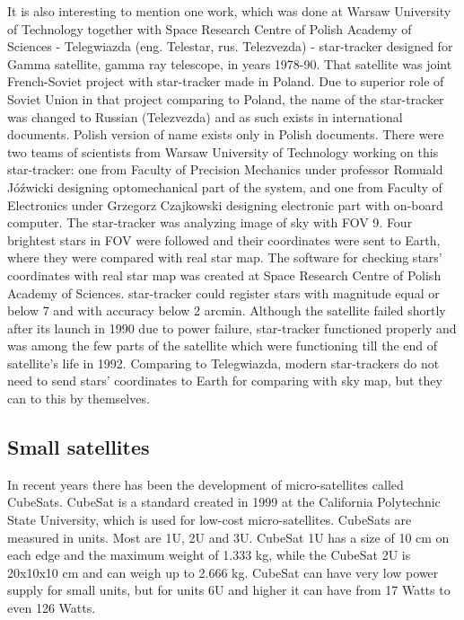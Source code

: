 \documentclass[12pt,a4paper,twoside]{article}
\begin{document}
It is also interesting to mention one work, which was done at Warsaw University of Technology together with Space Research Centre of Polish Academy of Sciences - Telegwiazda (eng. Telestar, rus. Telezvezda) - star-tracker designed for Gamma satellite, gamma ray telescope, in years 1978-90\cite{gamma-satellite}. That satellite was joint French-Soviet project with star-tracker made in Poland. Due to superior role of Soviet Union in that project comparing to Poland, the name of the star-tracker was changed to Russian (Telezvezda) and as such exists in international documents. Polish version of name exists only in Polish documents. There were two teams of scientists from Warsaw University of Technology working on this star-tracker: one from Faculty of Precision Mechanics under professor Romuald Jóźwicki designing optomechanical part of the system, and one from Faculty of Electronics under Grzegorz Czajkowski designing electronic part with on-board computer\cite{wut-space-research}.
The star-tracker was analyzing image of sky with FOV 9\degree . Four brightest stars in FOV were followed and their coordinates were sent to Earth, where they were compared with real star map. The software for checking stars' coordinates with real star map was created at Space Research Centre of Polish Academy of Sciences. star-tracker could register stars with magnitude equal or below 7 and with accuracy below 2 arcmin\cite{optical-devices-cbk}. Although the satellite failed shortly after its launch in 1990 due to power failure, star-tracker functioned properly and was among the few parts of the satellite which were functioning till the end of satellite's life in 1992. Comparing to Telegwiazda, modern star-trackers do not need to send stars' coordinates to Earth for comparing with sky map, but they can to this by themselves.


\subsection{Small satellites}

In recent years there has been the development of micro-satellites called CubeSats. CubeSat is a standard created in 1999 at the California Polytechnic State University\cite{heidt2000cubesat}, which is used for low-cost micro-satellites. CubeSats are measured in units. Most are 1U, 2U and 3U. CubeSat 1U has a size of 10 cm on each edge and the maximum weight of 1.333 kg, while the CubeSat 2U is 20x10x10 cm and can weigh up to 2.666 kg. CubeSat can have very low power supply for small units, but for units 6U and higher it can have from 17 Watts\cite{cubesat-panels} to even 126 Watts\cite{nanosat-tables}.
\end{document}
